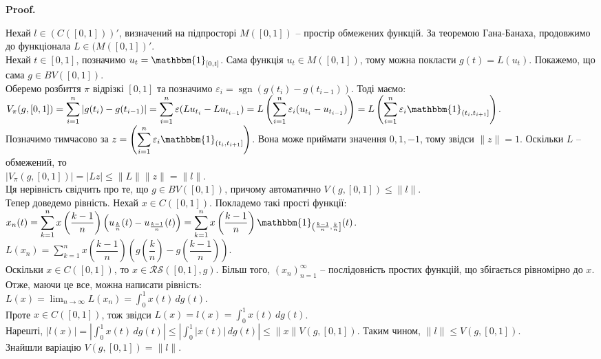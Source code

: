 \documentclass[a4paper, 10pt]{article}
\makeatletter
\theoremstyle{theoremdd}
\theoremstyle{theoremdd}
\theoremstyle{theoremdd}
\theoremstyle{theoremdd}
\theoremstyle{theoremdd}
\theoremstyle{theoremdd}
\theoremstyle{theoremdd}
\theoremstyle{theoremdd}
\renewenvironment{proof}[1][Proof.\\]{\par
\pushQED{\hfill \qed}%
\normalfont \topsep6\p@\@plus6\p@\relax
\trivlist
\item\relax
{\bfseries
#1\@addpunct{.}}\hspace\labelsep\ignorespaces
}{%
\popQED\endtrivlist\@endpefalse
}
\DeclareMathOperator{\sign}{sgn}
\makeatother
\begin{document}
\begin{proof}
Нехай $l \in (C([0,1]))'$, визначений на підпросторі $M([0,1])$ -- простір обмежених функцій. За теоремою Гана-Банаха, продовжимо до функціонала $L \in (M([0,1])'$.\\
Нехай $t \in [0,1]$, позначимо $u_t = \mathbbm{1}_{[0,t]}$. Сама функція $u_t \in M([0,1])$, тому можна покласти $g(t) = L(u_t)$. Покажемо, що сама $g \in BV([0,1])$.\\
Оберемо розбиття $\pi$ відрізкі $[0,1]$ та позначимо $\varepsilon_i = \sign(g(t_{i}) - g(t_{i-1}))$. Тоді маємо:\\
$V_\pi(g,[0,1]) = \displaystyle\sum_{i=1}^{n} |g(t_i) - g(t_{i-1})| = \sum_{i=1}^n \varepsilon (Lu_{t_{i}} - Lu_{t_{i-1}}) = L \left(\sum_{i=1}^n \varepsilon_i (u_{t_i} - u_{t_{i-1}})\right) = L \left( \sum_{i=1}^n \varepsilon_i \mathbbm{1}_{(t_i,t_{i+1}]} \right)$.\\
Позначимо тимчасово за $\displaystyle z = \left( \sum_{i=1}^n \varepsilon_i \mathbbm{1}_{(t_i,t_{i+1}]} \right)$. Вона може приймати значення $0,1,-1$, тому звідси $\|z\| = 1$. Оскільки $L$ -- обмежений, то\\
$|V_\pi(g,[0,1])| = |Lz| \leq \|L\| \|z\| = \|l\|$.\\
Ця нерівність свідчить про те, що $g \in BV([0,1])$, причому автоматично $V(g,[0,1]) \leq \|l\|$.
\bigskip \\
Тепер доведемо рівність. Нехай $x \in C([0,1])$. Покладемо такі прості функції:\\
$x_n(t) = \displaystyle\sum_{k=1}^n x\left(\dfrac{k-1}{n}\right) \left( u_{\frac{k}{n}}(t) - u_{\frac{k-1}{n}}(t) \right) = \sum_{k=1}^n x\left( \dfrac{k-1}{n} \right) \mathbbm{1}_{\left(\frac{k-1}{n},\frac{k}{n}\right]}(t)$.\\
$L(x_n) = \displaystyle\sum_{k=1}^n x\left(\dfrac{k-1}{n}\right) \left( g\left(\dfrac{k}{n}\right) - g\left(\dfrac{k-1}{n}\right) \right)$.\\
Оскільки $x \in C([0,1])$, то $x \in \mathcal{RS}([0,1],g)$. Більш того, $(x_n)_{n=1}^\infty$ -- послідовність простих функцій, що збігається рівномірно до $x$. Отже, маючи це все, можна написати рівність:\\
$L(x) = \displaystyle\lim_{n \to \infty} L(x_n) = \int_0^1 x(t)\,dg(t)$.\\
Проте $x \in C([0,1])$, тож звідси $L(x) = l(x) = \displaystyle\int_0^1 x(t)\,dg(t)$.\\
Нарешті, $|l(x)| = \displaystyle \left| \int_0^1 x(t)\,dg(t) \right| \leq \left| \int_0^1 |x(t)|\,dg(t) \right| \leq \|x\| V(g,[0,1])$. Таким чином, $\|l\| \leq V(g,[0,1])$.\\
Знайшли варіацію $V(g,[0,1]) = \|l\|$.
\end{proof}
\end{document}
